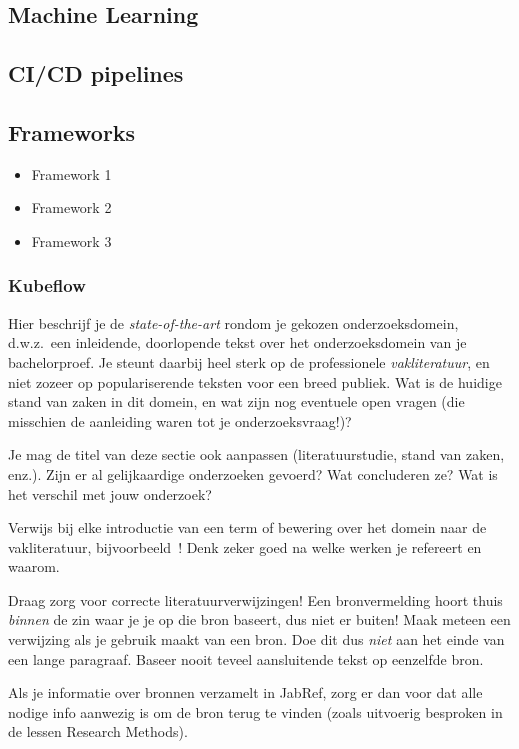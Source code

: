 \subsection{Machine Learning}
\subsection{CI/CD pipelines}
\subsection{Frameworks}
\begin{itemize}
    \item Framework 1
    \item Framework 2
    \item Framework 3
\end{itemize}
\subsubsection{Kubeflow}

Hier beschrijf je de \emph{state-of-the-art} rondom je gekozen onderzoeksdomein, d.w.z.\ een inleidende, doorlopende tekst over het onderzoeksdomein van je bachelorproef. Je steunt daarbij heel sterk op de professionele \emph{vakliteratuur}, en niet zozeer op populariserende teksten voor een breed publiek. Wat is de huidige stand van zaken in dit domein, en wat zijn nog eventuele open vragen (die misschien de aanleiding waren tot je onderzoeksvraag!)?

Je mag de titel van deze sectie ook aanpassen (literatuurstudie, stand van zaken, enz.). Zijn er al gelijkaardige onderzoeken gevoerd? Wat concluderen ze? Wat is het verschil met jouw onderzoek?

Verwijs bij elke introductie van een term of bewering over het domein naar de vakliteratuur, bijvoorbeeld~\autocite{Hykes2013}! Denk zeker goed na welke werken je refereert en waarom.

Draag zorg voor correcte literatuurverwijzingen! Een bronvermelding hoort thuis \emph{binnen} de zin waar je je op die bron baseert, dus niet er buiten! Maak meteen een verwijzing als je gebruik maakt van een bron. Doe dit dus \emph{niet} aan het einde van een lange paragraaf. Baseer nooit teveel aansluitende tekst op eenzelfde bron.

Als je informatie over bronnen verzamelt in JabRef, zorg er dan voor dat alle nodige info aanwezig is om de bron terug te vinden (zoals uitvoerig besproken in de lessen Research Methods).

